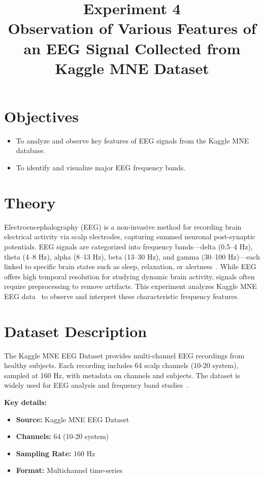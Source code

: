 \documentclass[a4paper,11pt]{article}
\title{Experiment 4\\ Observation of Various Features of an EEG Signal Collected from Kaggle MNE Dataset}
\author{}
\date{}
\begin{document}

\newpage

\maketitle
{}

\vspace{-5em}

\section*{Objectives}
\begin{itemize}
    \item To analyze and observe key features of EEG signals from the Kaggle MNE database.
    \item To identify and visualize major EEG frequency bands.
\end{itemize}

\section*{Theory}
Electroencephalography (EEG) is a non-invasive method for recording brain electrical activity via scalp electrodes, capturing summed neuronal post-synaptic potentials. EEG signals are categorized into frequency bands—delta (0.5–4 Hz), theta (4–8 Hz), alpha (8–13 Hz), beta (13–30 Hz), and gamma (30–100 Hz)—each linked to specific brain states such as sleep, relaxation, or alertness~\cite{niedermeyer2005electroencephalography}. While EEG offers high temporal resolution for studying dynamic brain activity, signals often require preprocessing to remove artifacts. This experiment analyzes Kaggle MNE EEG data~\cite{kagglemnedataset} to observe and interpret these characteristic frequency features.

\section*{Dataset Description}
The Kaggle MNE EEG Dataset provides multi-channel EEG recordings from healthy subjects. Each recording includes 64 scalp channels (10-20 system), sampled at 160 Hz, with metadata on channels and subjects. The dataset is widely used for EEG analysis and frequency band studies~\cite{kagglemnedataset}.

\textbf{Key details:}
\begin{itemize}
    \item \textbf{Source:} Kaggle MNE EEG Dataset~\cite{kagglemnedataset}
    \item \textbf{Channels:} 64 (10-20 system)
    \item \textbf{Sampling Rate:} 160 Hz
    \item \textbf{Format:} Multichannel time-series
\end{itemize}
\end{document}
